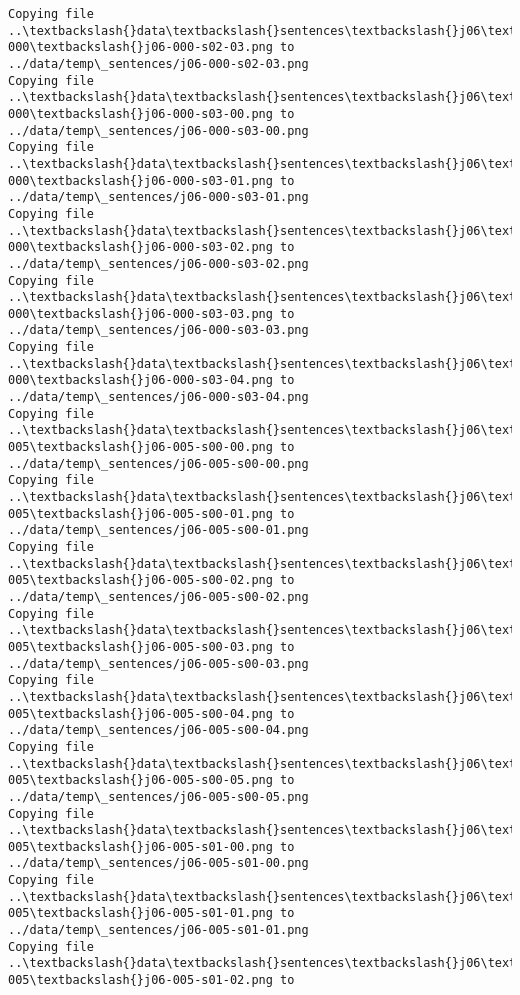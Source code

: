\documentclass[11pt]{article}
\begin{document}
\begin{Verbatim}[commandchars=\\\{\}]
Copying file ..\textbackslash{}data\textbackslash{}sentences\textbackslash{}j06\textbackslash{}j06-000\textbackslash{}j06-000-s02-03.png to
../data/temp\_sentences/j06-000-s02-03.png
Copying file ..\textbackslash{}data\textbackslash{}sentences\textbackslash{}j06\textbackslash{}j06-000\textbackslash{}j06-000-s03-00.png to
../data/temp\_sentences/j06-000-s03-00.png
Copying file ..\textbackslash{}data\textbackslash{}sentences\textbackslash{}j06\textbackslash{}j06-000\textbackslash{}j06-000-s03-01.png to
../data/temp\_sentences/j06-000-s03-01.png
Copying file ..\textbackslash{}data\textbackslash{}sentences\textbackslash{}j06\textbackslash{}j06-000\textbackslash{}j06-000-s03-02.png to
../data/temp\_sentences/j06-000-s03-02.png
Copying file ..\textbackslash{}data\textbackslash{}sentences\textbackslash{}j06\textbackslash{}j06-000\textbackslash{}j06-000-s03-03.png to
../data/temp\_sentences/j06-000-s03-03.png
Copying file ..\textbackslash{}data\textbackslash{}sentences\textbackslash{}j06\textbackslash{}j06-000\textbackslash{}j06-000-s03-04.png to
../data/temp\_sentences/j06-000-s03-04.png
Copying file ..\textbackslash{}data\textbackslash{}sentences\textbackslash{}j06\textbackslash{}j06-005\textbackslash{}j06-005-s00-00.png to
../data/temp\_sentences/j06-005-s00-00.png
Copying file ..\textbackslash{}data\textbackslash{}sentences\textbackslash{}j06\textbackslash{}j06-005\textbackslash{}j06-005-s00-01.png to
../data/temp\_sentences/j06-005-s00-01.png
Copying file ..\textbackslash{}data\textbackslash{}sentences\textbackslash{}j06\textbackslash{}j06-005\textbackslash{}j06-005-s00-02.png to
../data/temp\_sentences/j06-005-s00-02.png
Copying file ..\textbackslash{}data\textbackslash{}sentences\textbackslash{}j06\textbackslash{}j06-005\textbackslash{}j06-005-s00-03.png to
../data/temp\_sentences/j06-005-s00-03.png
Copying file ..\textbackslash{}data\textbackslash{}sentences\textbackslash{}j06\textbackslash{}j06-005\textbackslash{}j06-005-s00-04.png to
../data/temp\_sentences/j06-005-s00-04.png
Copying file ..\textbackslash{}data\textbackslash{}sentences\textbackslash{}j06\textbackslash{}j06-005\textbackslash{}j06-005-s00-05.png to
../data/temp\_sentences/j06-005-s00-05.png
Copying file ..\textbackslash{}data\textbackslash{}sentences\textbackslash{}j06\textbackslash{}j06-005\textbackslash{}j06-005-s01-00.png to
../data/temp\_sentences/j06-005-s01-00.png
Copying file ..\textbackslash{}data\textbackslash{}sentences\textbackslash{}j06\textbackslash{}j06-005\textbackslash{}j06-005-s01-01.png to
../data/temp\_sentences/j06-005-s01-01.png
Copying file ..\textbackslash{}data\textbackslash{}sentences\textbackslash{}j06\textbackslash{}j06-005\textbackslash{}j06-005-s01-02.png to

\end{Verbatim}
\end{document}
